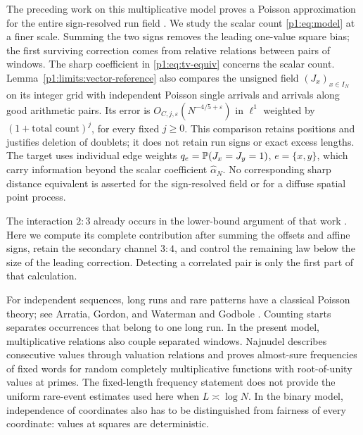 The preceding work on this multiplicative model proves a Poisson
approximation for the entire sign-resolved run field
\cite[Theorem~1.1]{pouly2026c}. We study the scalar count
\eqref{p1:eq:model} at a finer scale. Summing the two signs removes
the leading one-value square bias; the first surviving correction
comes from relative relations between pairs of windows.
The sharp coefficient in \eqref{p1:eq:tv-equiv} concerns the
scalar count. Lemma~\ref{p1:limits:vector-reference} also compares
the unsigned field \((J_x)_{x\in I_N}\) on its integer grid with
independent Poisson single arrivals and arrivals along good
arithmetic pairs. Its error is
\(O_{C,j,\varepsilon}(N^{-4/5+\varepsilon})\) in \(\ell^1\)
weighted by \((1+\text{total count})^j\), for every fixed
\(j\ge0\). This comparison retains positions and justifies
deletion of doublets; it does not retain run signs or exact
excess lengths. The target uses individual edge weights
\(q_e=\P(J_x=J_y=1)\), \(e=\{x,y\}\), which carry information beyond the
scalar coefficient \(\widehat\alpha_N\).
No corresponding sharp distance equivalent is asserted for the
sign-resolved field or for a diffuse spatial point process.

The interaction \(2:3\) already occurs in the lower-bound
argument of that work \cite[Section~3.6, equation~(3.22)]{pouly2026c}.
Here we compute its complete contribution after summing the
offsets and affine signs, retain the secondary channel \(3:4\),
and control the remaining law below the size of the leading
correction. Detecting a correlated pair is only the first part
of that calculation.

For independent sequences, long runs and rare patterns have a
classical Poisson theory; see Arratia, Gordon, and Waterman
\cite{agw1990} and Godbole \cite{godbole1991}. Counting starts
separates occurrences that belong to one long run. In the present
model, multiplicative relations also couple separated windows.
Najnudel \cite[Lemma~3.1 and Proposition~6.3]{najnudel2020}
describes consecutive values through valuation relations and
proves almost-sure frequencies of fixed words for random
completely multiplicative functions with root-of-unity values
at primes. The fixed-length frequency statement does not
provide the uniform rare-event estimates used here when
\(L\asymp\log N\). In the binary model, independence of coordinates
also has to be distinguished from fairness of every coordinate:
values at squares are deterministic.

